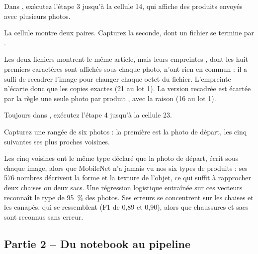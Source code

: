 \begin{obtenir}
  \item Dans , exécutez l'étape 3 jusqu'à la cellule 14, qui affiche des produits envoyés avec plusieurs photos.
  \item La cellule montre deux paires. Capturez la seconde, dont un fichier se termine par .
\end{obtenir}
\begin{lecture}
Les deux fichiers montrent le même article, mais leurs empreintes , dont les huit premiers
caractères sont affichés sous chaque photo, n'ont rien en commun : il a suffi de recadrer l'image pour
changer chaque octet du fichier. L'empreinte n'écarte donc que les copies exactes (21 au lot 1). La
version recadrée est écartée par la règle \og une seule photo par produit \fg{}, avec la raison
 (16 au lot 1).
\end{lecture}

\begin{obtenir}
  \item Toujours dans , exécutez l'étape 4 jusqu'à la cellule 23.
  \item Capturez une rangée de six photos : la première est la photo de départ, les cinq suivantes ses plus proches voisines.
\end{obtenir}
\begin{lecture}
Les cinq voisines ont le même type déclaré que la photo de départ, écrit sous chaque image, alors que
MobileNet n'a jamais vu nos six types de produits : ses 576 nombres décrivent la forme et la texture
de l'objet, ce qui suffit à rapprocher deux chaises ou deux sacs. Une régression logistique entraînée
sur ces vecteurs reconnaît le type de 95~\% des photos. Ses erreurs se concentrent sur les chaises et
les canapés, qui se ressemblent (F1 de 0,89 et 0,90), alors que chaussures et sacs sont reconnus sans
erreur.
\end{lecture}


\subsection*{Partie 2 -- Du notebook au pipeline \hfill {}}

